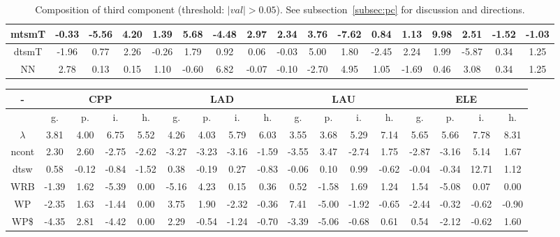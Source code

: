 \documentclass[%
 aip,
 jmp,%
 amsmath,amssymb,
 reprint,%
]{revtex4-1}
\begin{document}
\begin{table}
\begin{tabular}{|c|| c|c|c|c|| c|c|c|c|| c|c|c|c|| c|c|c|c|}
mtsmT & -0.33 & -5.56 & 4.20 & 1.39 & 5.68 & -4.48 & 2.97 & 2.34 & 3.76 & -7.62 & 0.84 & 1.13 & 9.98 & 2.51 & -1.52 & -1.03 \\\hline
dtsmT & -1.96 & 0.77 & 2.26 & -0.26 & 1.79 & 0.92 & 0.06 & -0.03 & 5.00 & 1.80 & -2.45 & 2.24 & 1.99 & -5.87 & 0.34 & 1.25 \\\hline
NN & 2.78 & 0.13 & 0.15 & 1.10 & -0.60 & 6.82 & -0.07 & -0.10 & -2.70 & 4.95 & 1.05 & -1.69 & 0.46 & 3.08 & 0.34 & 1.25 \\\hline
\end{tabular}
  \caption{Composition of third component (threshold: $|val|>0.05$). See subsection~\ref{subsec:pc} for discussion and directions.}\label{tab:pca3}
\end{table}


\begin{table}
\begin{tabular}{|c|| c|c|c|c|| c|c|c|c|| c|c|c|c|| c|c|c|c|}\hline
  \centering
    \scriptsize
\setlength{\tabcolsep}{.06667em}
-\-  & \multicolumn{4}{c|}{CPP} & \multicolumn{4}{c|}{LAD} & \multicolumn{4}{c|}{LAU} & \multicolumn{4}{c|}{ELE} \\ \hline\hline
 & g. & p. & i. & h. &     g. & p. & i. & h. &    g. & p. & i. & h. &    g. & p. & i. & h. \\\hline
$\lambda$ & 3.81 & 4.00 & 6.75 & 5.52 & 4.26 & 4.03 & 5.79 & 6.03 & 3.55 & 3.68 & 5.29 & 7.14 & 5.65 & 5.66 & 7.78 & 8.31 \\\hline
ncont & 2.30 & 2.60 & -2.75 & -2.62 & -3.27 & -3.23 & -3.16 & -1.59 & -3.55 & 3.47 & -2.74 & 1.75 & -2.87 & -3.16 & 5.14 & 1.67 \\\hline
dtsw & 0.58 & -0.12 & -0.84 & -1.52 & 0.38 & -0.19 & 0.27 & -0.83 & -0.06 & 0.10 & 0.99 & -0.62 & -0.04 & -0.34 & 12.71 & 1.12 \\\hline
WRB & -1.39 & 1.62 & -5.39 & 0.00 & -5.16 & 4.23 & 0.15 & 0.36 & 0.52 & -1.58 & 1.69 & 1.24 & 1.54 & -5.08 & 0.07 & 0.00 \\\hline
WP & -2.35 & 1.63 & -1.44 & 0.00 & 3.75 & 1.90 & -2.32 & -0.36 & 7.41 & -5.00 & -1.92 & -0.65 & -2.44 & -0.32 & -0.62 & -0.90 \\\hline
WP\$ & -4.35 & 2.81 & -4.42 & 0.00 & 2.29 & -0.54 & -1.24 & -0.70 & -3.39 & -5.06 & -0.68 & 0.61 & 0.54 & -2.12 & -0.62 & 1.60 \\\hline

\end{tabular}
\end{table}
\end{document}
